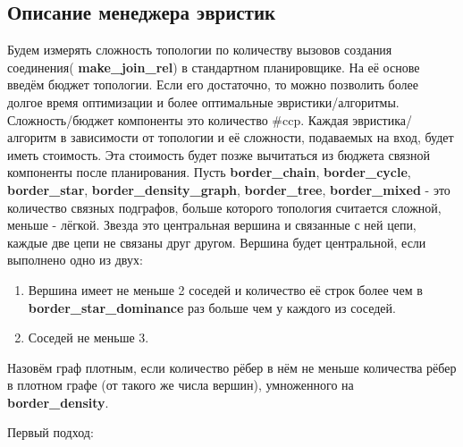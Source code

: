 \documentclass[12pt]{article}
\begin{document}
\begin{flushleft}
\section*{Описание менеджера эвристик}

Будем измерять сложность топологии по количеству вызовов создания соединения( \textbf{make\_join\_rel}) в стандартном планировщике. 
На её основе введём бюджет  топологии. Если его достаточно, то можно позволить более долгое время оптимизации и более оптимальные эвристики/алгоритмы.
Сложность/бюджет компоненты это количество \#ccp.
Каждая эвристика/алгоритм в зависимости от топологии и её сложности, подаваемых на вход, будет иметь стоимость. Эта стоимость будет позже вычитаться из бюджета связной компоненты после планирования. 
\newline
Пусть \textbf{border\_chain}, \textbf{border\_cycle}, \textbf{border\_star}, \textbf{border\_density\_graph}, \textbf{border\_tree}, \textbf{border\_mixed} - это количество связных подграфов, больше которого топология считается сложной, меньше - лёгкой.
\newline
Звезда это центральная вершина и связанные с ней цепи, каждые две цепи не связаны друг другом.
Вершина будет центральной, если выполнено одно из двух:
\begin{enumerate}
    \item Вершина имеет не меньше 2 соседей и количество её строк более чем в \textbf{border\_star\_dominance} раз больше чем у каждого из соседей.
    \item Соседей не меньше 3.
\end{enumerate}

Назовём граф плотным, если количество рёбер в нём не меньше количества рёбер в плотном графе (от такого же числа вершин), умноженного на \textbf{border\_density}.
\newline

\begin{center}
Первый подход:
\end{center}


\end{flushleft}
\end{document}

